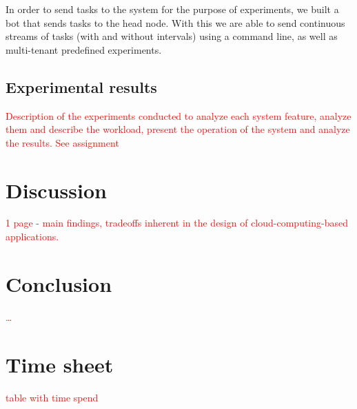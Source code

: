 \documentclass{stylesheet}
\begin{document}
In order to send tasks to the system for the purpose of experiments, we built a bot that sends tasks to the head node. With this we are able to send continuous streams of tasks (with and without intervals) using a command line, as well as multi-tenant predefined experiments. 

\subsection{Experimental results}
\label{subsec:results}
\textcolor{red}{Description of the experiments conducted to analyze each system feature, analyze them and describe the workload, present the operation of the system and analyze the results. See assignment}

\section{Discussion}
\label{sec:discussion}
\textcolor{red}{1 page - main findings, tradeoffs inherent in the design of cloud-computing-based applications.}

\section{Conclusion}
\label{sec:conclusion}
\textcolor{red}{\ldots}

%
%

\appendix
\section{Time sheet}
\label{app:time}
\textcolor{red}{table with time spend}
\end{document}
